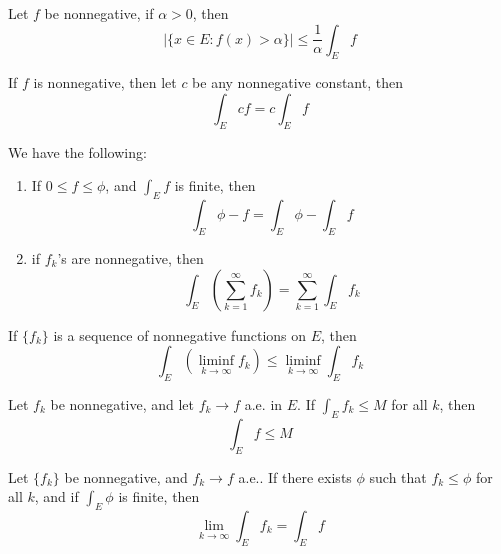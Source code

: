 \documentclass[openany]{book}
\begin{document}
\begin{thm}[Chebyshev]
    Let $f$ be nonnegative, if $\alpha>0$, then 
    \begin{equation*}
        |\{x\in E: f(x)>\alpha\}|\leq\frac{1}{\alpha}\int_Ef
    \end{equation*}
\end{thm}
\begin{prop}
    If $f$ is nonnegative, then let $c$ be any nonnegative constant, then 
    \begin{equation*}
        \int_Ecf=c\int_Ef
    \end{equation*}
\end{prop}
\begin{prop}
    We have the following:
    \begin{enumerate}
        \item If $0\leq f\leq\phi$, and $\int_Ef$ is finite, then 
        \begin{equation*}
            \int_E\phi-f=\int_E\phi-\int_Ef
        \end{equation*}
        \item if $f_k$'s are nonnegative, then 
        \begin{equation*}
            \int_E\left(\sum_{k=1}^\infty f_k\right)=\sum_{k=1}^\infty\int_Ef_k
        \end{equation*}
    \end{enumerate}
\end{prop}

\begin{thm}
    If $\{f_k\}$ is a sequence of nonnegative functions on $E$, then 
    \begin{equation*}
        \int_E(\liminf_{k\to\infty}f_k)\leq\liminf_{k\to\infty}\int_Ef_k
    \end{equation*}
\end{thm}
\begin{prop}
    Let $f_k$ be nonnegative, and let $f_k\to f$ a.e. in $E$. If $\int_Ef_k\leq M$ for all $k$, then 
    \begin{equation*}
        \int_E f\leq M
    \end{equation*}
\end{prop}
\begin{thm}
    Let $\{f_k\}$ be nonnegative, and $f_k\to f$ a.e.. If there exists $\phi$ such that $f_k\leq\phi$ for all $k$, and if $\int_E\phi$ is finite, then 
    \begin{equation*}
        \lim_{k\to\infty}\int_Ef_k=\int_Ef
    \end{equation*}
\end{thm}
\end{document}
